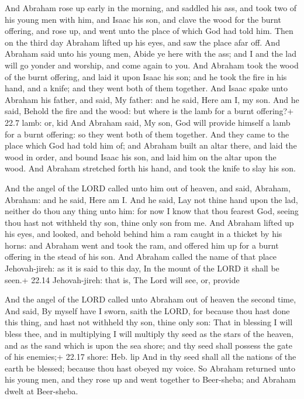 And Abraham rose up early in the morning, and saddled his
ass, and took two of his young men with him, and Isaac his son, and
clave the wood for the burnt offering, and rose up, and went unto the
place of which God had told him.  Then on the third day
Abraham lifted up his eyes, and saw the place afar off.  And
Abraham said unto his young men, Abide ye here with the ass; and I and
the lad will go yonder and worship, and come again to you. 
And Abraham took the wood of the burnt offering, and laid it upon Isaac
his son; and he took the fire in his hand, and a knife; and they went
both of them together.  And Isaac spake unto Abraham his
father, and said, My father: and he said, Here am I, my son. And he
said, Behold the fire and the wood: but where is the lamb for a burnt
offering?+ 22.7 lamb: or, kid  And Abraham said, My son, God
will provide himself a lamb for a burnt offering: so they went both of
them together.  And they came to the place which God had
told him of; and Abraham built an altar there, and laid the wood in
order, and bound Isaac his son, and laid him on the altar upon the wood.
 And Abraham stretched forth his hand, and took the knife
to slay his son.

 And the angel of the LORD called unto him out of heaven,
and said, Abraham, Abraham: and he said, Here am I.  And he
said, Lay not thine hand upon the lad, neither do thou any thing unto
him: for now I know that thou fearest God, seeing thou hast not withheld
thy son, thine only son from me.  And Abraham lifted up his
eyes, and looked, and behold behind him a ram caught in a thicket by his
horns: and Abraham went and took the ram, and offered him up for a burnt
offering in the stead of his son.  And Abraham called the
name of that place Jehovah-jireh: as it is said to this day, In the
mount of the LORD it shall be seen.+ 22.14 Jehovah-jireh: that is, The
Lord will see, or, provide

 And the angel of the LORD called unto Abraham out of
heaven the second time,  And said, By myself have I sworn,
saith the LORD, for because thou hast done this thing, and hast not
withheld thy son, thine only son:  That in blessing I will
bless thee, and in multiplying I will multiply thy seed as the stars of
the heaven, and as the sand which is upon the sea shore; and thy seed
shall possess the gate of his enemies;+ 22.17 shore: Heb. lip
 And in thy seed shall all the nations of the earth be
blessed; because thou hast obeyed my voice.  So Abraham
returned unto his young men, and they rose up and went together to
Beer-sheba; and Abraham dwelt at Beer-sheba.

